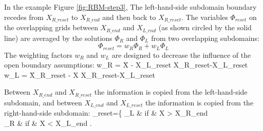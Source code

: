 In the example Figure \ref{fig:RBM-step3}, The left-hand-side subdomain boundary recedes from $X_{R\_reset}$ to $X_{R\_end}$ and then back to $X_{R\_reset}$. The variables $\Phi_{reset}$ on the overlapping grids between $X_{R\_end}$ and $X_{L\_end}$ (as shown circled by the solid line) are averaged by the solutions $\Phi_{R}$ and $\Phi_{L}$ from two overlapping subdomains:
\begin{equation}
\Phi_{reset} = w_R \Phi_{R} + w_L \Phi_{L}
\end{equation}
The weighting factors $w_R$ and $w_L$ are designed to decrease the influence of the open boundary assumptions:
\be
w_R = \f{X - X_{L\_reset} }{X_{R\_reset}-X_{L\_reset}}
\ee
\be
w_L = \f{X_{R\_reset} - X }{X_{R\_reset}-X_{L\_reset}}
\ee

Between $X_{R\_end}$ and $X_{R\_reset}$ the information is copied from the left-hand-side subdomain, and between $X_{L\_end}$ and $X_{L\_reset}$ the information is copied from the right-hand-side subdomain:
\be
\Phi_{reset}=\left\{
\Phi_{L}      & if & X > X_{R\_end} \\
\Phi_{R}      & if & X < X_{L\_end}
\eaa
\right.
\ee






















